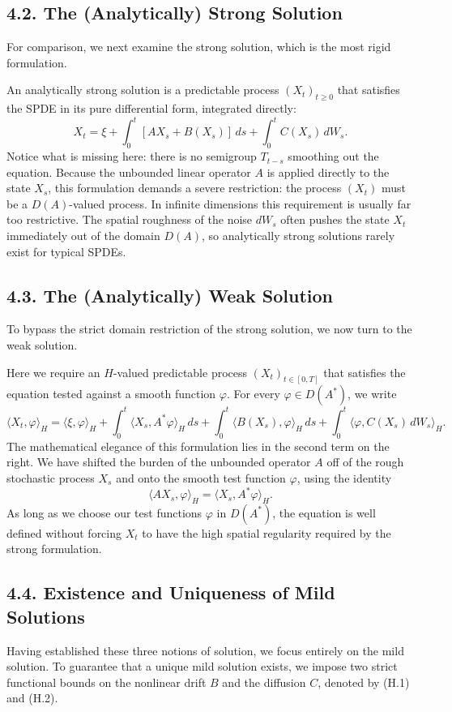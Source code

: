 \documentclass[11pt]{article}
\theoremstyle{definition}
\theoremstyle{remark}
\begin{document}
\subsection*{4.2. The (Analytically) Strong Solution}
For comparison, we next examine the strong solution, which is the most rigid formulation.

An analytically strong solution is a predictable process \((X_t)_{t\ge 0}\) that satisfies the SPDE in its pure differential form, integrated directly:
\[
X_t
=
\xi+\int_0^t [AX_s+B(X_s)]\,ds+\int_0^t C(X_s)\,dW_s.
\]
Notice what is missing here: there is no semigroup \(T_{t-s}\) smoothing out the equation. Because the unbounded linear operator \(A\) is applied directly to the state \(X_s\), this formulation demands a severe restriction: the process \((X_t)\) must be a \(D(A)\)-valued process. In infinite dimensions this requirement is usually far too restrictive. The spatial roughness of the noise \(dW_s\) often pushes the state \(X_t\) immediately out of the domain \(D(A)\), so analytically strong solutions rarely exist for typical SPDEs.

\subsection*{4.3. The (Analytically) Weak Solution}
To bypass the strict domain restriction of the strong solution, we now turn to the weak solution.

Here we require an \(H\)-valued predictable process \((X_t)_{t\in[0,T]}\) that satisfies the equation tested against a smooth function \(\varphi\). For every \(\varphi\in D(A^*)\), we write
\[
\langle X_t,\varphi\rangle_H
=
\langle \xi,\varphi\rangle_H
+\int_0^t \langle X_s,A^*\varphi\rangle_H\,ds
+\int_0^t \langle B(X_s),\varphi\rangle_H\,ds
+\int_0^t \langle \varphi,C(X_s)\,dW_s\rangle_H.
\]
The mathematical elegance of this formulation lies in the second term on the right. We have shifted the burden of the unbounded operator \(A\) off of the rough stochastic process \(X_s\) and onto the smooth test function \(\varphi\), using the identity
\[
\langle AX_s,\varphi\rangle_H=\langle X_s,A^*\varphi\rangle_H.
\]
As long as we choose our test functions \(\varphi\) in \(D(A^*)\), the equation is well defined without forcing \(X_t\) to have the high spatial regularity required by the strong formulation.

\subsection*{4.4. Existence and Uniqueness of Mild Solutions}
Having established these three notions of solution, we focus entirely on the mild solution. To guarantee that a unique mild solution exists, we impose two strict functional bounds on the nonlinear drift \(B\) and the diffusion \(C\), denoted by \textnormal{(H.1)} and \textnormal{(H.2)}.
\end{document}
